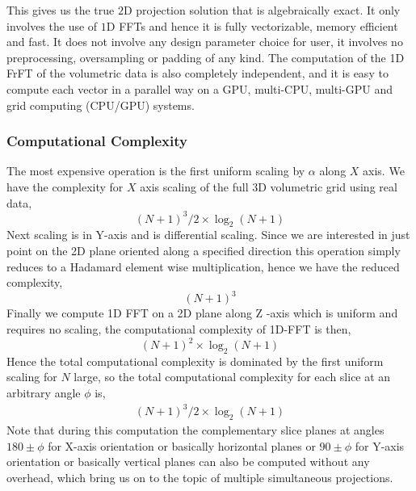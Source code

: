 \documentclass{UCF_ETD}
\begin{document}
This gives us the true $2$D projection solution that is algebraically exact. It only involves the use of $1$D FFTs and hence it is fully vectorizable, memory efficient and fast. It does not involve any design parameter choice for user, it involves no preprocessing, oversampling or padding of any kind. The computation of the 1D FrFT of the volumetric data is also completely independent, and it is easy to compute each vector in a parallel way on a GPU, multi-CPU, multi-GPU and grid computing (CPU/GPU) systems. 

\subsubsection{Computational Complexity}
The most expensive operation is the first uniform scaling by $\alpha$ along $X$ axis.
We have  the complexity for $X$ axis scaling of the full 3D volumetric grid using real data,
$$(N+1)^3/2 \times \log_2(N+1)$$  
Next scaling is in Y-axis and is differential scaling. Since we are interested in just point on the 2D plane oriented along a specified direction this operation simply reduces to a Hadamard element wise multiplication, hence we have the reduced complexity,
$$(N+1)^3 $$
Finally we compute 1D FFT on a 2D plane along Z -axis which is uniform and requires no scaling, the computational complexity of 1D-FFT is then,
$$(N+1)^2  \times \log_2(N+1)$$ 
Hence the total computational complexity is dominated by the first uniform scaling for $N$ large, so the total computational complexity for each slice at an arbitrary angle $\phi $ is,
\begin{eqnarray}
(N+1)^3/2 \times \log_2(N+1)
\end{eqnarray}
Note that during this computation the complementary slice planes at angles $180 \pm \phi$ for X-axis orientation or basically horizontal planes or $90 \pm \phi$ for Y-axis orientation or basically vertical planes can also be computed without any overhead, which bring us on to the topic of multiple simultaneous projections.  
\end{document}
